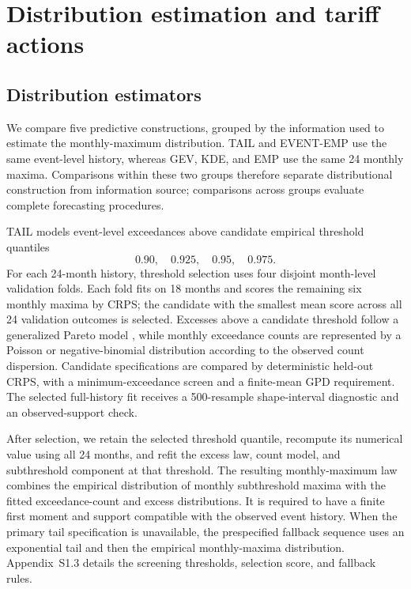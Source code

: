 \documentclass[suppldata]{interact}
\begin{document}
\section{Distribution estimation and tariff actions}
\label{sec:distribution-estimation-actions}

\subsection{Distribution estimators}
\label{sec:distribution-estimators}

We compare five predictive constructions, grouped by the information
used to estimate the monthly-maximum distribution. TAIL and EVENT-EMP
use the same event-level history, whereas GEV, KDE, and EMP use the
same 24 monthly maxima. Comparisons within these two groups therefore
separate distributional construction from information source;
comparisons across groups evaluate complete forecasting procedures.

TAIL models event-level exceedances above candidate empirical
threshold quantiles
\[
0.90,\quad 0.925,\quad 0.95,\quad 0.975.
\]
For each 24-month history, threshold selection uses four disjoint
month-level validation folds. Each fold fits on 18 months and scores the
remaining six monthly maxima by CRPS; the candidate with the smallest
mean score across all 24 validation outcomes is selected. Excesses above a candidate
threshold follow a generalized Pareto model \citep{DavisonSmith1990},
while monthly exceedance counts are represented by a Poisson or
negative-binomial distribution according to the observed count
dispersion. Candidate specifications are compared by deterministic held-out
CRPS, with a minimum-exceedance screen and a finite-mean GPD requirement.
The selected full-history fit receives a 500-resample shape-interval
diagnostic and an observed-support check.

After selection, we retain the selected threshold quantile, recompute
its numerical value using all 24 months, and refit the excess law,
count model, and subthreshold component at that threshold. The resulting monthly-maximum law combines the empirical
distribution of monthly subthreshold maxima with the fitted
exceedance-count and excess distributions. It is required to have a
finite first moment and support compatible with the observed event
history. When the primary tail
specification is unavailable, the prespecified fallback sequence uses
an exponential tail and then the empirical monthly-maxima distribution.
Appendix~S1.3 details the screening thresholds, selection score,
and fallback rules.
\end{document}

